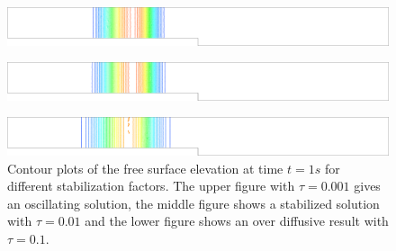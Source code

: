 \documentclass[a4paper,12pt]{article}
\begin{document}
\begin{figure}[H]
\begin{subfigure}{.05\textwidth}
    \caption{}
\end{subfigure}
\begin{minipage}[c]{.94\textwidth}
    \includegraphics[width=\textwidth]{img/step/stab_0.001_time_1.pdf}        
\end{minipage}
\par\medskip
\begin{subfigure}{.05\textwidth}
    \caption{}
\end{subfigure}
\begin{minipage}[c]{.94\textwidth}
    \includegraphics[width=\textwidth]{img/step/stab_0.01_time_1.pdf}        
\end{minipage}
\par\medskip
\begin{subfigure}{.05\textwidth}
    \caption{}
\end{subfigure}
\begin{minipage}[c]{.94\textwidth}
    \includegraphics[width=\textwidth]{img/step/stab_0.1_time_1.pdf}        
\end{minipage}
\caption{Contour plots of the free surface elevation at time $t=1s$ for different stabilization factors. The upper figure with $\tau=0.001$ gives an oscillating solution, the middle figure shows a stabilized solution with $\tau=0.01$ and the lower figure shows an over diffusive result with $\tau=0.1$.}
\label{stab_parameters_time1}
\end{figure}
\end{document}
